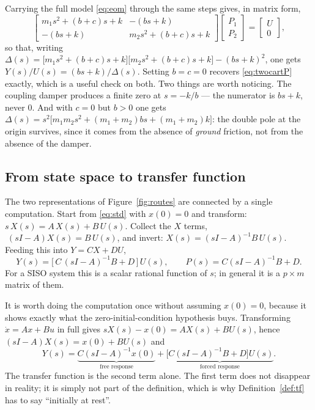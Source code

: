 \documentclass[11pt]{article}
\begin{document}
\begin{remark}\label{rem:fullTF}
Carrying the full model \eqref{eq:eom} through the same steps gives, in matrix
form,
\[
   \begin{bmatrix}
     m_1s^{2}+(b+c)s+k & -(bs+k)\\[3pt]
     -(bs+k) & m_2s^{2}+(b+c)s+k
   \end{bmatrix}
   \begin{bmatrix}P_1\\[3pt] P_2\end{bmatrix}
   = \begin{bmatrix}U\\[3pt] 0\end{bmatrix},
\]
so that, writing
$\Delta(s) = \bigl[m_1s^{2}+(b+c)s+k\bigr]\bigl[m_2s^{2}+(b+c)s+k\bigr]-(bs+k)^{2}$,
one gets $Y(s)/U(s) = (bs+k)/\Delta(s)$.
Setting $b=c=0$ recovers \eqref{eq:twocartP} exactly, which is a useful check on
both. Two things are worth noticing. The coupling damper produces a finite zero
at $s=-k/b$ --- the numerator is $bs+k$, never $0$. And with $c=0$ but $b>0$ one
gets $\Delta(s)=s^{2}\bigl[m_1m_2s^{2}+(m_1+m_2)bs+(m_1+m_2)k\bigr]$: the double
pole at the origin survives, since it comes from the absence of \emph{ground}
friction, not from the absence of the damper.
\end{remark}

\subsection{From state space to transfer function}\label{sec:ss2tf}
The two representations of Figure~\ref{fig:routes} are connected by a single
computation. Start from \eqref{eq:std} with $x(0)=0$ and transform:
$s\,X(s) = A\,X(s) + B\,U(s)$. Collect the $X$ terms, $\;(sI-A)X(s) = B\,U(s)$,
and invert: $X(s) = (sI-A)^{-1}B\,U(s)$. Feeding this into $Y = CX + DU$,
\begin{equation}\label{eq:ss2tf}
   \boxed{\;Y(s) = \bigl[\,C\,(sI-A)^{-1}B + D\,\bigr]\,U(s),
   \qquad P(s) = C(sI-A)^{-1}B + D. \;}
\end{equation}
For a SISO system this is a scalar rational function of $s$; in general it is a
$p\times m$ matrix of them.

\begin{remark}
It is worth doing the computation once without assuming $x(0)=0$, because it
shows exactly what the zero-initial-condition hypothesis buys. Transforming
$\dot x = Ax+Bu$ in full gives $sX(s)-x(0) = AX(s)+BU(s)$, hence
$(sI-A)X(s) = x(0) + BU(s)$ and
\[
   Y(s) = \underbrace{C(sI-A)^{-1}x(0)}_{\text{free response}}
        + \underbrace{\bigl[C(sI-A)^{-1}B+D\bigr]U(s)}_{\text{forced response}} .
\]
The transfer function is the second term alone. The first term does not
disappear in reality; it is simply not part of the definition, which is why
Definition~\ref{def:tf} has to say ``initially at rest''.
\end{remark}
\end{document}

